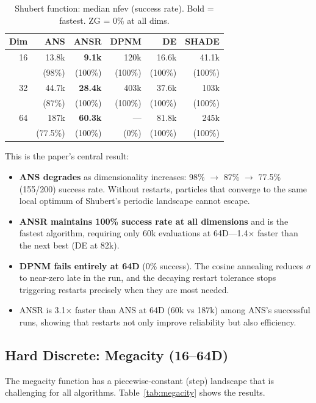 \documentclass[11pt,a4paper]{article}
\begin{document}
\begin{table}[h]
\centering
\caption{Shubert function: median nfev (success rate). Bold = fastest. ZG = 0\% at all dims.}
\label{tab:shubert}
\begin{tabular}{@{}rrrrrr@{}}
\toprule
Dim & ANS & \textbf{ANSR} & DPNM & DE & SHADE \\
\midrule
16 & 13.8k & \textbf{9.1k} & 120k  & 16.6k & 41.1k \\
   & (98\%) & (100\%) & (100\%) & (100\%) & (100\%) \\
32 & 44.7k & \textbf{28.4k} & 403k  & 37.6k & 103k \\
   & (87\%) & (100\%) & (100\%) & (100\%) & (100\%) \\
64 & 187k  & \textbf{60.3k} & ---   & 81.8k & 245k \\
   & (77.5\%) & (100\%) & (0\%)   & (100\%) & (100\%) \\
\bottomrule
\end{tabular}
\end{table}

This is the paper's central result:
\begin{itemize}
    \item \textbf{ANS degrades} as dimensionality increases: 98\% $\to$ 87\% $\to$ 77.5\% (155/200) success rate. Without restarts, particles that converge to the same local optimum of Shubert's periodic landscape cannot escape.
    \item \textbf{ANSR maintains 100\% success rate at all dimensions} and is the fastest algorithm, requiring only 60k evaluations at 64D---1.4$\times$ faster than the next best (DE at 82k).
    \item \textbf{DPNM fails entirely at 64D} (0\% success). The cosine annealing reduces $\sigma$ to near-zero late in the run, and the decaying restart tolerance stops triggering restarts precisely when they are most needed.
    \item ANSR is 3.1$\times$ faster than ANS at 64D (60k vs 187k) among ANS's successful runs, showing that restarts not only improve reliability but also efficiency.
\end{itemize}

\subsection{Hard Discrete: Megacity (16--64D)}

The megacity function has a piecewise-constant (step) landscape that is challenging for all algorithms. Table~\ref{tab:megacity} shows the results.
\end{document}

